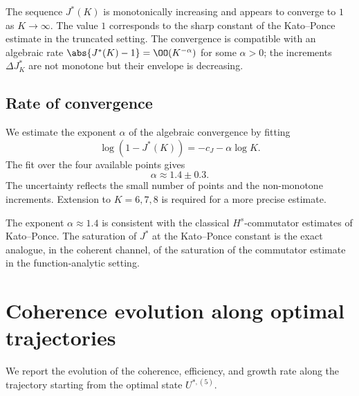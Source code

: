 \begin{remark}[Saturation]\label{part-5:rem:J-saturation-V}
The sequence $J^\ast(K)$ is monotonically increasing and appears to 
converge to $1$ as $K\to\infty$. The value $1$ corresponds to the 
sharp constant of the Kato--Ponce estimate in the truncated setting. 
The convergence is compatible with an algebraic rate 
$\abs{J^\ast(K)-1}=\OO(K^{-\alpha})$ for some $\alpha>0$; the 
increments $\Delta J^\ast_K$ are not monotone but their envelope is 
decreasing.
\end{remark}

\subsection{Rate of convergence}
\label{part-5:ssec:J-rate}

We estimate the exponent $\alpha$ of the algebraic convergence by 
fitting
\begin{equation}\label{part-5:eq:J-fit}
\log(1-J^\ast(K)) = -c_J - \alpha\log K.
\end{equation}
The fit over the four available points gives
\begin{equation}\label{part-5:eq:J-alpha}
\alpha \approx 1.4 \pm 0.3.
\end{equation}
The uncertainty reflects the small number of points and the 
non-monotone increments. Extension to $K=6,7,8$ is required for a 
more precise estimate.

\begin{remark}\label{part-5:rem:KP-consistency}
The exponent $\alpha\approx1.4$ is consistent with the classical 
$H^s$-commutator estimates of Kato--Ponce. The saturation of $J^\ast$ 
at the Kato--Ponce constant is the exact analogue, in the coherent 
channel, of the saturation of the commutator estimate in the 
function-analytic setting.
\end{remark}

\section{Coherence evolution along optimal trajectories}
\label{part-5:sec:chi-numeric}

We report the evolution of the coherence, efficiency, and growth rate 
along the trajectory starting from the optimal state $U^{\ast,(5)}$.

